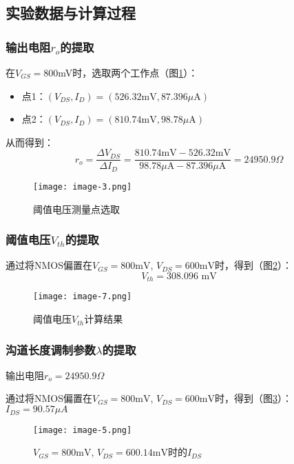 \documentclass[UTF8,12pt,a4paper]{ctexart}
\begin{document}
\subsection{实验数据与计算过程}
\subsubsection{输出电阻$r_o$的提取}
在$V_{GS}=800$mV时，选取两个工作点（图\ref{fig:task5a}）：
\begin{itemize}
\item 点1：$(V_{DS}, I_D) = (526.32\text{mV}, 87.396\mu\text{A})$
\item 点2：$(V_{DS}, I_D) = (810.74\text{mV}, 98.78\mu\text{A})$
\end{itemize}

从而得到：
\begin{equation}
  r_o = \frac{\Delta V_{DS}}{\Delta I_D} = \frac{810.74\text{mV}-526.32\text{mV}}{98.78\mu\text{A}-87.396\mu\text{A}} = 24950.9\Omega
\end{equation}
\begin{figure}[h]
\centering
\texttt{[image: image-3.png]}
\caption{阈值电压测量点选取}
\label{fig:task5a}
\end{figure}


\subsubsection{阈值电压$V_{th}$的提取}

通过将NMOS偏置在$V_{GS}=800\text{mV}$, $V_{DS}=600\text{mV}$时，得到（图\ref{fig:task5b}）：
\begin{equation}
V_{th} = 308.096\text{ mV}
\end{equation}

\begin{figure}[h]
\centering
\texttt{[image: image-7.png]}
\caption{阈值电压$V_{th}$计算结果}
\label{fig:task5b}
\end{figure}

\subsubsection{沟道长度调制参数$\lambda$的提取}

输出电阻$r_o=24950.9\Omega$

通过将NMOS偏置在$V_{GS}=800\text{mV}$, $V_{DS}=600\text{mV}$时，得到（图\ref{fig:task5d}）：
$I_{DS}=90.57\mu A$

\begin{figure}[h]
\centering
\texttt{[image: image-5.png]}
\caption{$V_{GS}=800\text{mV}$, $V_{DS}=600.14\text{mV}$时的$I_{DS}$}
\label{fig:task5d}
\end{figure}
\end{document}
